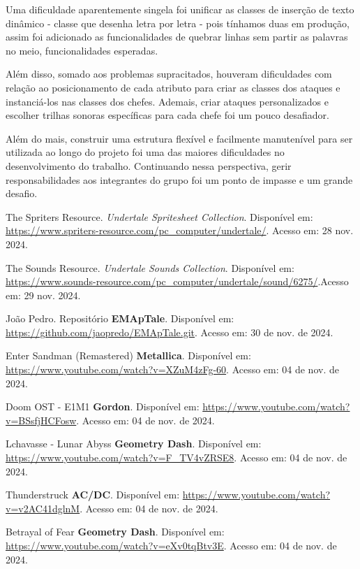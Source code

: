 \documentclass[a4paper, 12pt, twoside]{article}
\begin{document}
Uma dificuldade aparentemente singela foi unificar as classes de inserção de texto dinâmico - classe que desenha letra por letra - pois tínhamos duas em produção, assim foi adicionado as funcionalidades de quebrar linhas sem partir as palavras no meio, funcionalidades esperadas.

Além disso, somado aos problemas supracitados, houveram dificuldades com relação ao posicionamento de cada atributo para criar as classes dos ataques e instanciá-los nas classes dos chefes. Ademais, criar ataques personalizados e escolher trilhas sonoras específicas para cada chefe foi um pouco desafiador.

Além do mais, construir uma estrutura flexível e facilmente manutenível para ser utilizada ao longo do projeto foi uma das maiores dificuldades no desenvolvimento do trabalho. Continuando nessa perspectiva, gerir responsabilidades aos integrantes do grupo foi um ponto de impasse e um grande desafio.

\newpage
\begin{thebibliography}{99}

    The Spriters Resource.
    \textit{Undertale Spritesheet Collection}. Disponível em: \url{https://www.spriters-resource.com/pc_computer/undertale/}. Acesso em: 28 nov. 2024.

    The Sounds Resource.
    \textit{Undertale Sounds Collection}. Disponível em: \url{https://www.sounds-resource.com/pc_computer/undertale/sound/6275/}.Acesso em: 29 nov. 2024.

    João Pedro. Repositório \textbf{EMApTale}. Disponível em: \url{https://github.com/jaopredo/EMApTale.git}. Acesso em: 30 de nov. de 2024.

    Enter Sandman (Remastered) \textbf{Metallica}. Disponível em: \url{https://www.youtube.com/watch?v=XZuM4zFg-60}. Acesso em: 04 de nov. de 2024.

    Doom OST - E1M1  \textbf{Gordon}. Disponível em: \url{https://www.youtube.com/watch?v=BSsfjHCFosw}. Acesso em: 04 de nov. de 2024.
    
    Lchavasse - Lunar Abyss \textbf{Geometry Dash}. Disponível em: \url{https://www.youtube.com/watch?v=F_TV4vZRSE8}. Acesso em: 04 de nov. de 2024.

    Thunderstruck \textbf{AC/DC}. Disponível em: \url{https://www.youtube.com/watch?v=v2AC41dglnM}. Acesso em: 04 de nov. de 2024.

    Betrayal of Fear \textbf{Geometry Dash}. Disponível em: \url{https://www.youtube.com/watch?v=eXv0tqBtv3E}. Acesso em: 04 de nov. de 2024.
    
\end{thebibliography}
\end{document}
